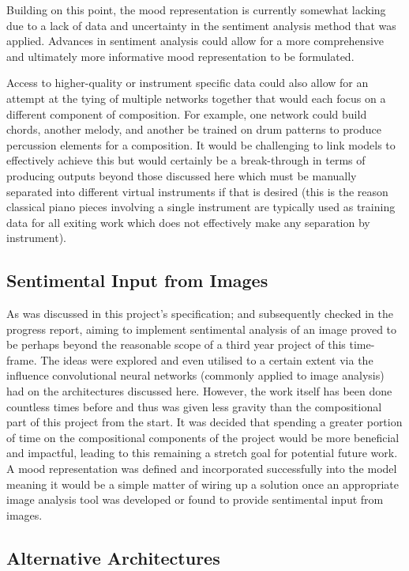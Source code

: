 \documentclass[12pt,]{article}
\begin{document}
Building on this point, the mood representation is currently somewhat
lacking due to a lack of data and uncertainty in the sentiment analysis
method that was applied. Advances in sentiment analysis could allow for
a more comprehensive and ultimately more informative mood representation
to be formulated.

Access to higher-quality or instrument specific data could also allow
for an attempt at the tying of multiple networks together that would
each focus on a different component of composition. For example, one
network could build chords, another melody, and another be trained on
drum patterns to produce percussion elements for a composition. It would
be challenging to link models to effectively achieve this but would
certainly be a break-through in terms of producing outputs beyond those
discussed here which must be manually separated into different virtual
instruments if that is desired (this is the reason classical piano
pieces involving a single instrument are typically used as training data
for all exiting work which does not effectively make any separation by
instrument).

\hypertarget{sentimental-input-from-images}{%
\subsection{Sentimental Input from
Images}\label{sentimental-input-from-images}}

As was discussed in this project's specification; and subsequently
checked in the progress report, aiming to implement sentimental analysis
of an image proved to be perhaps beyond the reasonable scope of a third
year project of this time-frame. The ideas were explored and even
utilised to a certain extent via the influence convolutional neural
networks (commonly applied to image analysis) had on the architectures
discussed here. However, the work itself has been done countless times
before and thus was given less gravity than the compositional part of
this project from the start. It was decided that spending a greater
portion of time on the compositional components of the project would be
more beneficial and impactful, leading to this remaining a stretch goal
for potential future work. A mood representation was defined and
incorporated successfully into the model meaning it would be a simple
matter of wiring up a solution once an appropriate image analysis tool
was developed or found to provide sentimental input from images.

\hypertarget{alternative-architectures}{%
\subsection{Alternative Architectures}\label{alternative-architectures}}
\end{document}
